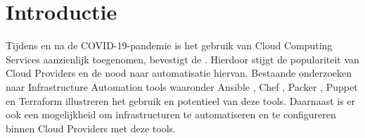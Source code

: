 
\section{Introductie}%
\label{sec:introductie}

\begin{comment}
Waarover zal je bachelorproef gaan? Introduceer het thema en zorg dat volgende zaken zeker duidelijk aanwezig zijn:

\begin{itemize}
  \item kaderen thema
  \item de doelgroep
  \item de probleemstelling en (centrale) onderzoeksvraag
  \item de onderzoeksdoelstelling
\end{itemize}

Denk er aan: een typische bachelorproef is \textit{toegepast onderzoek}, wat betekent dat je start vanuit een concrete probleemsituatie in bedrijfscontext, een \textbf{casus}. Het is belangrijk om je onderwerp goed af te bakenen: je gaat voor die \textit{ene specifieke probleemsituatie} op zoek naar een goede oplossing, op basis van de huidige kennis in het vakgebied.

De doelgroep moet ook concreet en duidelijk zijn, dus geen algemene of vaag gedefinieerde groepen zoals \emph{bedrijven}, \emph{developers}, \emph{Vlamingen}, enz. Je richt je in elk geval op it-professionals, een bachelorproef is geen populariserende tekst. Eén specifiek bedrijf (die te maken hebben met een concrete probleemsituatie) is dus beter dan \emph{bedrijven} in het algemeen.

Formuleer duidelijk de onderzoeksvraag! De begeleiders lezen nog steeds te veel voorstellen waarin we geen onderzoeksvraag terugvinden.

Schrijf ook iets over de doelstelling. Wat zie je als het concrete eindresultaat van je onderzoek, naast de uitgeschreven scriptie? Is het een proof-of-concept, een rapport met aanbevelingen, \ldots Met welk eindresultaat kan je je bachelorproef als een succes beschouwen?

\end{comment}

Tijdens en na de COVID-19-pandemie is het gebruik van Cloud Computing Services aanzienlijk toegenomen, bevestigt de \textcite{EU2021}. Hierdoor stijgt de populariteit van Cloud Providers en de nood naar automatisatie hiervan. Bestaande onderzoeken naar Infrastructure Automation tools waaronder Ansible \autocite{RedHat2022}, Chef \autocite{PSC2022}, Packer \autocite{HashiCorp2022}, Puppet \autocite{Perforce2022} en Terraform \autocite{HashiCorp2022a} illustreren het gebruik en potentieel van deze tools. Daarnaast is er ook een mogelijkheid om infrastructuren te automatiseren en te configureren binnen Cloud Providers met deze tools. 

